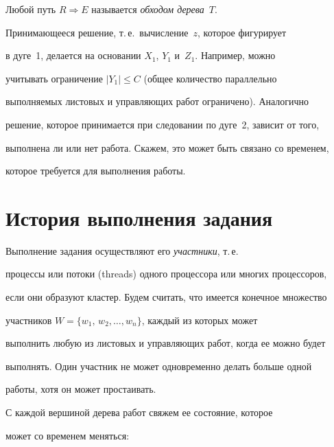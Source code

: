       


      Любой путь $R\Rightarrow E$ называется \textit{обходом дерева}~$T$.


      


      Принимающееся решение, т.\,е.\ вычисление~$z$, которое фигурирует 


в дуге~1, делается на основании $X_1$, $Y_1$ и~$Z_1$. Например, можно 


учитывать ограничение $|Y_1|\leq C$ (общее количество параллельно 


выполняемых листовых и управляющих работ ограничено).  Аналогично 


решение, которое принимается при следовании по дуге~2, зависит от того, 


выполнена ли  или нет работа. Скажем, это может быть связано со временем, 


которое требуется для выполнения работы. 





\section{История выполнения задания}





      Выполнение задания осуществляют его \textit{участники}, т.\,е.\ 


процессы или потоки (threads) одного процессора или многих процессоров, 


если они образуют кластер. Будем считать, что имеется конечное множество 


участников $W=\{w_1,\,w_2, \ldots ,w_n\}$, каждый из которых может 


выполнить любую из листовых и управляющих работ, когда ее можно будет 


выполнять. Один участник не может одновременно делать больше одной 


работы, хотя он может простаивать. 


      


      С каждой вершиной дерева работ свяжем ее состояние, которое 


может со временем меняться:\\[-15pt]


